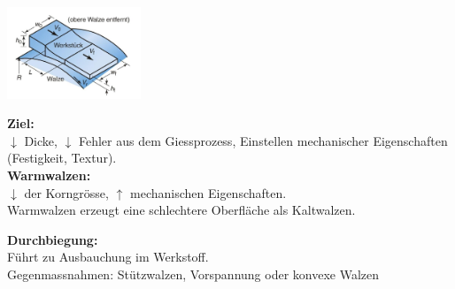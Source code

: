 \begin{center}
    \includegraphics[width = 40mm]{src/images/Walzen.png}\\
\end{center}
\textbf{Ziel:}\\
$\downarrow$ Dicke, $\downarrow$ Fehler aus dem Giessprozess, Einstellen mechanischer Eigenschaften (Festigkeit, Textur).\\

\textbf{Warmwalzen:}\\
$\downarrow$ der Korngrösse, $\uparrow $ mechanischen Eigenschaften. \\
Warmwalzen erzeugt eine schlechtere Oberfläche als Kaltwalzen.\\
\vfill \null \columnbreak

\textbf{Durchbiegung:}\\
Führt zu Ausbauchung im Werkstoff.\\
Gegenmassnahmen: 
Stützwalzen, Vorspannung oder konvexe Walzen\\

